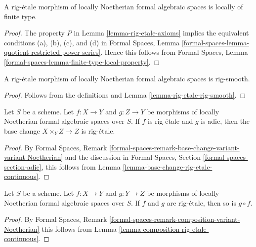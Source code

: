 \begin{lemma}
\label{lemma-rig-etale-finite-type}
A rig-\'etale morphism of locally Noetherian formal algebraic spaces
is locally of finite type.
\end{lemma}

\begin{proof}
The property $P$ in Lemma \ref{lemma-rig-etale-axioms}
implies the equivalent conditions (a), (b), (c), and (d) in
Formal Spaces, Lemma
\ref{formal-spaces-lemma-quotient-restricted-power-series}.
Hence this follows from
Formal Spaces, Lemma \ref{formal-spaces-lemma-finite-type-local-property}.
\end{proof}

\begin{lemma}
\label{lemma-rig-etale-rig-smooth-morphism}
A rig-\'etale morphism of locally Noetherian formal algebraic spaces
is rig-smooth.
\end{lemma}

\begin{proof}
Follows from the definitions and
Lemma \ref{lemma-rig-etale-rig-smooth}.
\end{proof}

\begin{lemma}
\label{lemma-base-change-rig-etale}
Let $S$ be a scheme. Let $f : X \to Y$ and $g : Z \to Y$
be morphisms of locally Noetherian formal algebraic spaces over $S$.
If $f$ is rig-\'etale and $g$ is adic, then the base change
$X \times_Y Z \to Z$ is rig-\'etale.
\end{lemma}

\begin{proof}
By Formal Spaces, Remark
\ref{formal-spaces-remark-base-change-variant-variant-Noetherian}
and the discussion in Formal Spaces, Section
\ref{formal-spaces-section-adic},
this follows from Lemma \ref{lemma-base-change-rig-etale-continuous}.
\end{proof}

\begin{lemma}
\label{lemma-composition-rig-etale}
Let $S$ be a scheme. Let $f : X \to Y$ and $g : Y \to Z$
be morphisms of locally Noetherian formal algebraic spaces over $S$.
If $f$ and $g$ are rig-\'etale, then so is $g \circ f$.
\end{lemma}

\begin{proof}
By Formal Spaces, Remark
\ref{formal-spaces-remark-composition-variant-Noetherian}
this follows from Lemma \ref{lemma-composition-rig-etale-continuous}.
\end{proof}

